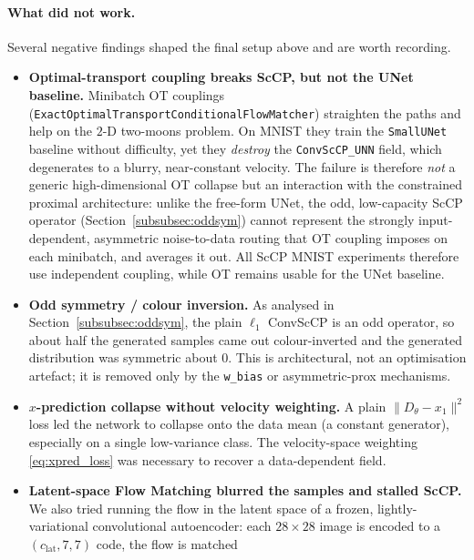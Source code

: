 \paragraph{What did not work.} Several negative findings shaped the final setup
above and are worth recording.
\begin{itemize}
    \item \textbf{Optimal-transport coupling breaks ScCP, but not the UNet
          baseline.} Minibatch OT couplings \cite{tong2023improving}
          (\texttt{ExactOptimalTransportConditionalFlowMatcher}) straighten the
          paths and help on the $2$-D two-moons problem. On MNIST they train the
          \texttt{SmallUNet} baseline without difficulty, yet they \emph{destroy}
          the \texttt{ConvScCP\_UNN} field, which degenerates to a blurry,
          near-constant velocity. The failure is therefore \emph{not} a generic
          high-dimensional OT collapse but an interaction with the constrained
          proximal architecture: unlike the free-form UNet, the odd, low-capacity
          ScCP operator (Section~\ref{subsubsec:oddsym}) cannot represent the
          strongly input-dependent, asymmetric noise-to-data routing that OT
          coupling imposes on each minibatch, and averages it out. All ScCP MNIST
          experiments therefore use independent coupling, while OT remains usable
          for the UNet baseline.
    \item \textbf{Odd symmetry / colour inversion.} As analysed in
          Section~\ref{subsubsec:oddsym}, the plain $\ell_1$ ConvScCP is an odd
          operator, so about half the generated samples came out colour-inverted
          and the generated distribution was symmetric about $0$. This is
          architectural, not an optimisation artefact; it is removed only by the
          \texttt{w\_bias} or asymmetric-prox mechanisms.
    \item \textbf{$x$-prediction collapse without velocity weighting.} A plain
          $\|D_\theta - x_1\|^2$ loss led the network to collapse onto the data
          mean (a constant generator), especially on a single low-variance class.
          The velocity-space weighting \eqref{eq:xpred_loss} was necessary to
          recover a data-dependent field.
    \item \textbf{Latent-space Flow Matching blurred the samples and stalled
          ScCP.} We also tried running the flow in the latent space of a frozen,
          lightly-variational convolutional autoencoder: each $28\times 28$ image
          is encoded to a $(c_{\text{lat}},7,7)$ code, the flow is matched

\end{itemize}
